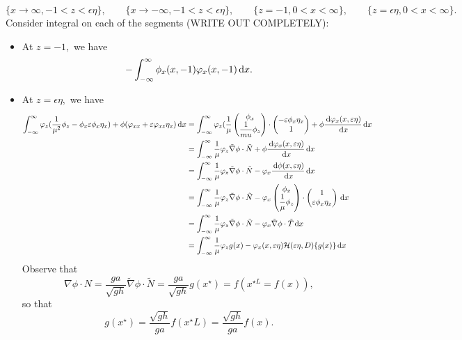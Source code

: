 \documentclass[10pt,reqno,oneside,a4paper]{article}
\begin{document}
\[ 
\{ x \to \infty, -1 < z < \epsilon\eta\}, \qquad \{ x \to -\infty, -1 < z < \epsilon\eta\}, \qquad \{ z = -1, 0<x<\infty\}, \qquad \{ z = \epsilon\eta, 0<x<\infty\}.
\]
Consider integral on each of the segments (WRITE OUT COMPLETELY):
\begin{itemize}
\item At $z = -1,$ we have 
\[ - \int^{\infty}_{-\infty} \phi_x(x,-1)\varphi_x(x,-1) \,\mathrm{d} x. \]
\item At $z = \epsilon \eta,$ we have 
\begin{align*}
\int_{-\infty}^{\infty} \varphi_z(\frac{1}{\mu^2}\phi_z - \phi_x \varepsilon \phi_x \eta_x ) + \phi(\varphi_{xx}  + \varepsilon \varphi_{xz} \eta_x) \,\mathrm{d} x &= \int_{-\infty}^{\infty} \varphi_z(\frac{1}{\mu} \begin{pmatrix} \phi_x  \\ \dfrac{1}{mu}\phi_z \end{pmatrix}\cdot \begin{pmatrix} -\varepsilon \phi_x \eta_x \\ 1 \end{pmatrix} + \phi \frac{\,\mathrm{d} \varphi_x(x, \varepsilon \eta)}{\,\mathrm{d} x} \,\mathrm{d} x \\
&= \int_{-\infty}^{\infty} \frac{1}{\mu} \varphi_z \tilde{\nabla} \phi \cdot \tilde{N}+ \phi \frac{\,\mathrm{d} \varphi_x(x, \varepsilon \eta)}{\,\mathrm{d} x} \,\mathrm{d} x \\
&= \int_{-\infty}^{\infty} \frac{1}{\mu} \varphi_z \tilde{\nabla} \phi \cdot \tilde{N} -\varphi_x \frac{\,\mathrm{d} \phi(x, \varepsilon \eta)}{\,\mathrm{d} x} \,\mathrm{d} x \\
&= \int_{-\infty}^{\infty} \frac{1}{\mu} \varphi_z \tilde{\nabla} \phi \cdot \tilde{N} -\varphi_x \begin{pmatrix} \phi_x  \\ \dfrac{1}{\mu}\phi_z \end{pmatrix} \cdot \begin{pmatrix} 1 \\ \varepsilon \phi_x \eta_x \end{pmatrix} \,\mathrm{d} x \\
&= \int_{-\infty}^{\infty} \frac{1}{\mu} \varphi_z \tilde{\nabla} \phi \cdot \tilde{N} -\varphi_x \tilde{\nabla} \phi \cdot \tilde{T} \,\mathrm{d} x \\
&= \int_{-\infty}^{\infty} \frac{1}{\mu} \varphi_z g(x) -\varphi_x(x, \varepsilon \eta) \mathcal{H}(\varepsilon \eta, D)\{ g(x) \} \,\mathrm{d} x
\end{align*}
Observe that 
\[ \nabla \phi \cdot N = \frac{ga}{\sqrt{gh}} \tilde{\nabla} \phi \cdot \tilde{N} = \frac{ga}{\sqrt{gh}} g(x^{\star}) = f(x^{\star L} = f(x)), \]
so that 
\[ 
g(x^{\star}) = \frac{\sqrt{gh}}{ga}f(x^{\star}L) = \frac{\sqrt{gh}}{ga}f(x).
\]
\end{itemize}
\end{document}
